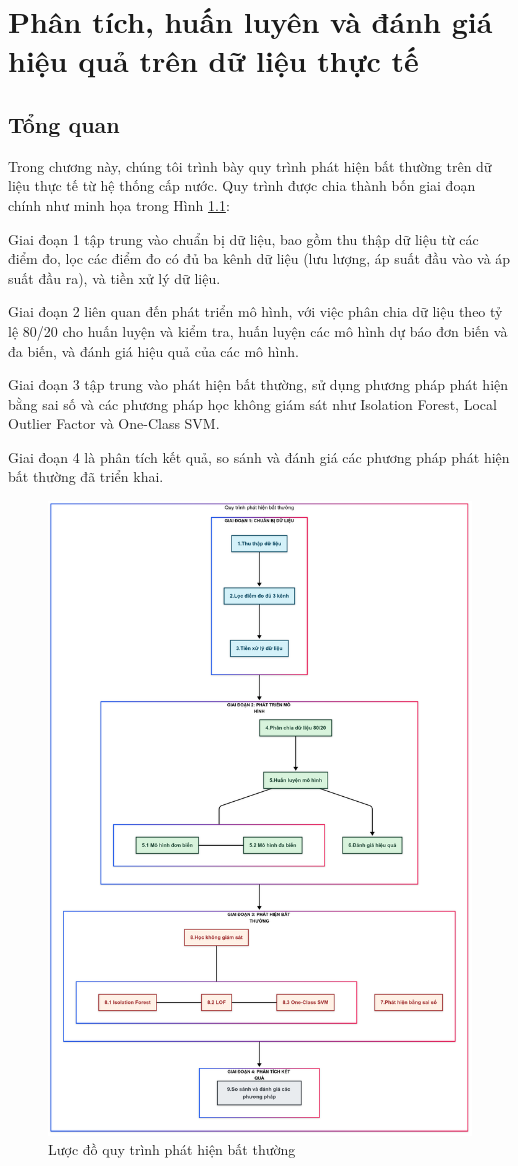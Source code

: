 \chapter{Phân tích, huấn luyên và đánh giá hiệu quả trên dữ liệu thực tế}
\section{Tổng quan}\label{ex-1}

Trong chương này, chúng tôi trình bày quy trình phát hiện bất thường trên dữ liệu thực tế từ hệ thống cấp nước. Quy trình được chia thành bốn giai đoạn chính như minh họa trong Hình \ref{fig:section6_1-experiment}:

Giai đoạn 1 tập trung vào chuẩn bị dữ liệu, bao gồm thu thập dữ liệu từ các điểm đo, lọc các điểm đo có đủ ba kênh dữ liệu (lưu lượng, áp suất đầu vào và áp suất đầu ra), và tiền xử lý dữ liệu.

Giai đoạn 2 liên quan đến phát triển mô hình, với việc phân chia dữ liệu theo tỷ lệ 80/20 cho huấn luyện và kiểm tra, huấn luyện các mô hình dự báo đơn biến và đa biến, và đánh giá hiệu quả của các mô hình.

Giai đoạn 3 tập trung vào phát hiện bất thường, sử dụng phương pháp phát hiện bằng sai số và các phương pháp học không giám sát như Isolation Forest, Local Outlier Factor và One-Class SVM.

Giai đoạn 4 là phân tích kết quả, so sánh và đánh giá các phương pháp phát hiện bất thường đã triển khai.

\begin{figure}[H]
    \centering
    \includegraphics[width=\linewidth]{image/section6_1/luoc_do_nghien_cuu_real_dataset.png}
    \caption{Lược đồ quy trình phát hiện bất thường}
    \label{fig:section6_1-experiment}
\end{figure}
